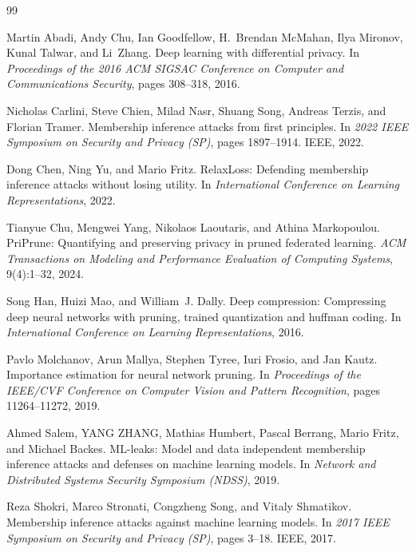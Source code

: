 \documentclass[11pt]{article}
\begin{document}
\begin{thebibliography}{99}

Martin Abadi, Andy Chu, Ian Goodfellow, H.~Brendan McMahan, Ilya Mironov, Kunal Talwar, and Li~Zhang.
\newblock Deep learning with differential privacy.
\newblock In \emph{Proceedings of the 2016 ACM SIGSAC Conference on Computer and Communications Security}, pages 308--318, 2016.

Nicholas Carlini, Steve Chien, Milad Nasr, Shuang Song, Andreas Terzis, and Florian Tramer.
\newblock Membership inference attacks from first principles.
\newblock In \emph{2022 IEEE Symposium on Security and Privacy (SP)}, pages 1897--1914. IEEE, 2022.

Dong Chen, Ning Yu, and Mario Fritz.
\newblock RelaxLoss: Defending membership inference attacks without losing utility.
\newblock In \emph{International Conference on Learning Representations}, 2022.

Tianyue Chu, Mengwei Yang, Nikolaos Laoutaris, and Athina Markopoulou.
\newblock PriPrune: Quantifying and preserving privacy in pruned federated learning.
\newblock \emph{ACM Transactions on Modeling and Performance Evaluation of Computing Systems}, 9(4):1--32, 2024.

Song Han, Huizi Mao, and William~J. Dally.
\newblock Deep compression: Compressing deep neural networks with pruning, trained quantization and huffman coding.
\newblock In \emph{International Conference on Learning Representations}, 2016.

Pavlo Molchanov, Arun Mallya, Stephen Tyree, Iuri Frosio, and Jan Kautz.
\newblock Importance estimation for neural network pruning.
\newblock In \emph{Proceedings of the IEEE/CVF Conference on Computer Vision and Pattern Recognition}, pages 11264--11272, 2019.

Ahmed Salem, YANG ZHANG, Mathias Humbert, Pascal Berrang, Mario Fritz, and Michael Backes.
\newblock ML-leaks: Model and data independent membership inference attacks and defenses on machine learning models.
\newblock In \emph{Network and Distributed Systems Security Symposium (NDSS)}, 2019.

Reza Shokri, Marco Stronati, Congzheng Song, and Vitaly Shmatikov.
\newblock Membership inference attacks against machine learning models.
\newblock In \emph{2017 IEEE Symposium on Security and Privacy (SP)}, pages 3--18. IEEE, 2017.


\end{thebibliography}
\end{document}
